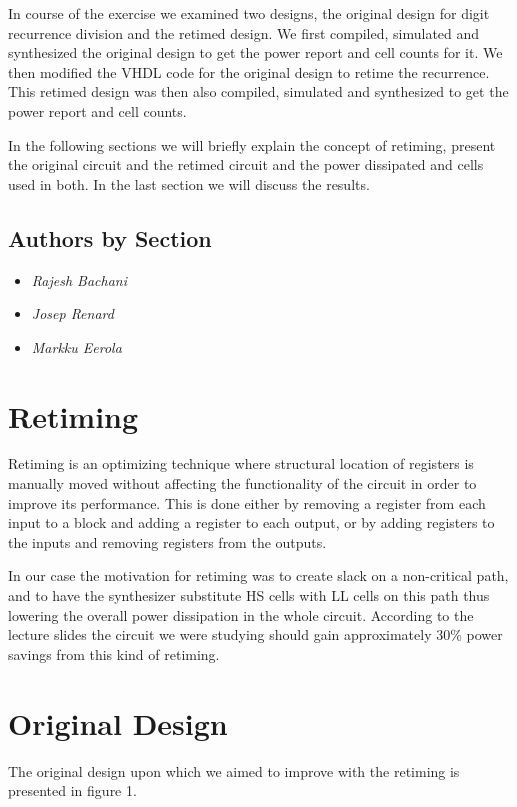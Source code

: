\documentclass[11pt,a4paper]{article}
\begin{document}
In course of the exercise we examined two designs, the original design for digit recurrence division and the retimed design. We first compiled, simulated and synthesized the original design to get the power report and cell counts for it. We then modified the VHDL code for the original design to retime the recurrence. This retimed design was then also compiled, simulated and synthesized to get the power report and cell counts.

In the following sections we will briefly explain the concept of retiming, present the original circuit and the retimed circuit and the power dissipated and cells used in both. In the last section we will discuss the results.

\subsection{Authors by Section}
\begin{itemize}
\item \textit{Rajesh Bachani} 
\item \textit{Josep Renard} 
\item \textit{Markku Eerola} 
\end{itemize}

\section{Retiming}
Retiming is an optimizing technique where structural location of registers is manually moved without affecting the functionality of the circuit in order to improve its performance. This is done either by removing a register from each input to a block and adding a register to each output, or by adding registers to the inputs and removing registers from the outputs.

In our case the motivation for retiming was to create slack on a non-critical path, and to have the synthesizer substitute HS cells with LL cells on this path thus lowering the overall power dissipation in the whole circuit. According to the lecture slides the circuit we were studying should gain approximately 30\% power savings from this kind of retiming.

\section{Original Design}
The original design upon which we aimed to improve with the retiming is presented in figure 1.
\end{document}
